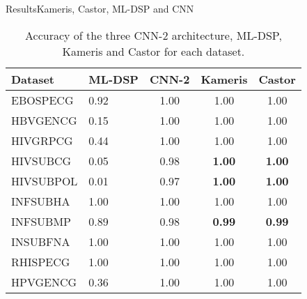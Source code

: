 \documentclass[10pt]{beamer}
\newcommand{\1}{
        	\setbeamertemplate{background}{
        		\texttt{[image: img/1]}
        		\tikz[overlay] \fill[fill opacity=0.75,fill=white] (0,0) rectangle (-\paperwidth,\paperheight);
        	}
}
\begin{document}
\begin{frame}{Results}{Kameris, Castor, ML-DSP and CNN}
	
\begin{table}[]
	\centering
	\caption{Accuracy of the three CNN-2 architecture, ML-DSP, Kameris and Castor for each dataset.}
	\label{tab:acc_cnn_full}	
	\begin{tabular}{p{2cm}p{1.6cm}ccc}
		\hline
		Dataset          & ML-DSP & CNN-2 & Kameris       & Castor        \\ \hline
		EBOSPECG    & 0.92   & 1.00  & 1.00          & 1.00          \\
		HBVGENCG    & 0.15   & 1.00  & 1.00          & 1.00          \\
		HIVGRPCG    & 0.44   & 1.00  & 1.00          & 1.00          \\
		HIVSUBCG    & 0.05   & 0.98  & \textbf{1.00} & \textbf{1.00} \\
		HIVSUBPOL   & 0.01   & 0.97  & \textbf{1.00} & \textbf{1.00} \\
		INFSUBHA    & 1.00   & 1.00  & 1.00          & 1.00          \\
		INFSUBMP    & 0.89   & 0.98  & \textbf{0.99} & \textbf{0.99} \\
		INSUBFNA    & 1.00   & 1.00  & 1.00          & 1.00          \\
		RHISPECG    & 1.00   & 1.00  & 1.00          & 1.00          \\
		HPVGENCG    & 0.36   & 1.00  & 1.00          & 1.00          \\ \hline
		
	\end{tabular}
\end{table}
	
\end{frame}
\end{document}

